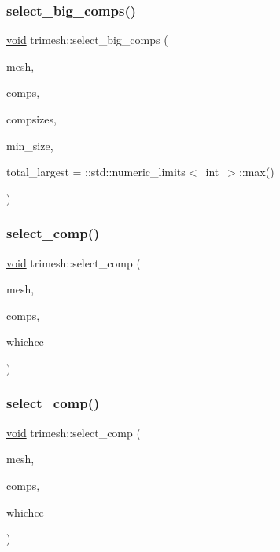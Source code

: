 \subsubsection{\texorpdfstring{select\+\_\+big\+\_\+comps()}{select\_big\_comps()}\hspace{0.1cm}{\footnotesize\ttfamily [2/2]}}
{\footnotesize\ttfamily \hyperlink{namespacetrimesh_a784ddfd979e1c579bda795a8edfc3f43}{void} trimesh\+::select\+\_\+big\+\_\+comps (\begin{DoxyParamCaption}\item[{\hyperlink{classtrimesh_1_1TriMesh}{Tri\+Mesh} $\ast$}]{mesh,  }\item[{const \+::std\+::vector$<$ int $>$ \&}]{comps,  }\item[{const \+::std\+::vector$<$ int $>$ \&}]{compsizes,  }\item[{int}]{min\+\_\+size,  }\item[{int}]{total\+\_\+largest = {\ttfamily \+:\+:std\+:\+:numeric\+\_\+limits$<$~int~$>$\+:\+:max()} }\end{DoxyParamCaption})}

\mbox{\label{namespacetrimesh_a6173bbe274b30b3f79edc101cc93f40c}} 
\subsubsection{\texorpdfstring{select\+\_\+comp()}{select\_comp()}\hspace{0.1cm}{\footnotesize\ttfamily [1/2]}}
{\footnotesize\ttfamily \hyperlink{namespacetrimesh_a784ddfd979e1c579bda795a8edfc3f43}{void} trimesh\+::select\+\_\+comp (\begin{DoxyParamCaption}\item[{\hyperlink{classtrimesh_1_1TriMesh}{Tri\+Mesh} $\ast$}]{mesh,  }\item[{const vector$<$ int $>$ \&}]{comps,  }\item[{int}]{whichcc }\end{DoxyParamCaption})}

\mbox{\label{namespacetrimesh_ad5569b44306d1bd25b5964524a46e6be}} 
\subsubsection{\texorpdfstring{select\+\_\+comp()}{select\_comp()}\hspace{0.1cm}{\footnotesize\ttfamily [2/2]}}
{\footnotesize\ttfamily \hyperlink{namespacetrimesh_a784ddfd979e1c579bda795a8edfc3f43}{void} trimesh\+::select\+\_\+comp (\begin{DoxyParamCaption}\item[{\hyperlink{classtrimesh_1_1TriMesh}{Tri\+Mesh} $\ast$}]{mesh,  }\item[{const \+::std\+::vector$<$ int $>$ \&}]{comps,  }\item[{int}]{whichcc }\end{DoxyParamCaption})}

